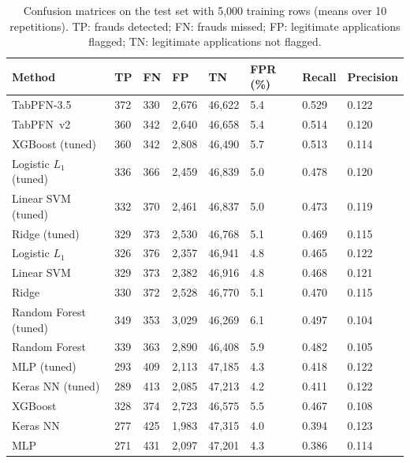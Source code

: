 \begin{table}[htbp]
\caption{Confusion matrices on the test set with 5{,}000 training rows (means over 10 repetitions). TP: frauds detected; FN: frauds missed; FP: legitimate applications flagged; TN: legitimate applications not flagged.}
\label{tab:conf5000}
\begin{tabular*}{\tblwidth}{@{}LLLLLLLL@{}}
\toprule
Method & TP & FN & FP & TN & FPR (\%) & Recall & Precision \\
\midrule
TabPFN-3.5 & 372 & 330 & 2{,}676 & 46{,}622 & 5.4 & 0.529 & 0.122 \\
TabPFN~v2 & 360 & 342 & 2{,}640 & 46{,}658 & 5.4 & 0.514 & 0.120 \\
XGBoost (tuned) & 360 & 342 & 2{,}808 & 46{,}490 & 5.7 & 0.513 & 0.114 \\
Logistic $L_1$ (tuned) & 336 & 366 & 2{,}459 & 46{,}839 & 5.0 & 0.478 & 0.120 \\
Linear SVM (tuned) & 332 & 370 & 2{,}461 & 46{,}837 & 5.0 & 0.473 & 0.119 \\
Ridge (tuned) & 329 & 373 & 2{,}530 & 46{,}768 & 5.1 & 0.469 & 0.115 \\
Logistic $L_1$ & 326 & 376 & 2{,}357 & 46{,}941 & 4.8 & 0.465 & 0.122 \\
Linear SVM & 329 & 373 & 2{,}382 & 46{,}916 & 4.8 & 0.468 & 0.121 \\
Ridge & 330 & 372 & 2{,}528 & 46{,}770 & 5.1 & 0.470 & 0.115 \\
Random Forest (tuned) & 349 & 353 & 3{,}029 & 46{,}269 & 6.1 & 0.497 & 0.104 \\
Random Forest & 339 & 363 & 2{,}890 & 46{,}408 & 5.9 & 0.482 & 0.105 \\
MLP (tuned) & 293 & 409 & 2{,}113 & 47{,}185 & 4.3 & 0.418 & 0.122 \\
Keras NN (tuned) & 289 & 413 & 2{,}085 & 47{,}213 & 4.2 & 0.411 & 0.122 \\
XGBoost & 328 & 374 & 2{,}723 & 46{,}575 & 5.5 & 0.467 & 0.108 \\
Keras NN & 277 & 425 & 1{,}983 & 47{,}315 & 4.0 & 0.394 & 0.123 \\
MLP & 271 & 431 & 2{,}097 & 47{,}201 & 4.3 & 0.386 & 0.114 \\
\bottomrule
\end{tabular*}
\end{table}
